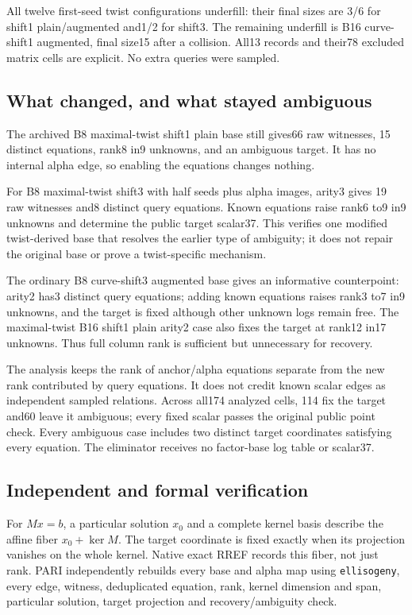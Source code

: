 \documentclass[
  10pt,
]{article}
\begin{document}
All twelve first-seed twist configurations underfill: their final sizes
are 3/6 for shift1 plain/augmented and1/2 for shift3. The remaining
underfill is B16 curve-shift1 augmented, final size15 after a collision.
All13 records and their78 excluded matrix cells are explicit. No extra
queries were sampled.

\subsection{What changed, and what stayed
ambiguous}\label{what-changed-and-what-stayed-ambiguous}

The archived B8 maximal-twist shift1 plain base still gives66 raw
witnesses, 15 distinct equations, rank8 in9 unknowns, and an ambiguous
target. It has no internal alpha edge, so enabling the equations changes
nothing.

For B8 maximal-twist shift3 with half seeds plus alpha images, arity3
gives 19 raw witnesses and8 distinct query equations. Known equations
raise rank6 to9 in9 unknowns and determine the public target scalar37.
This verifies one modified twist-derived base that resolves the earlier
type of ambiguity; it does not repair the original base or prove a
twist-specific mechanism.

The ordinary B8 curve-shift3 augmented base gives an informative
counterpoint: arity2 has3 distinct query equations; adding known
equations raises rank3 to7 in9 unknowns, and the target is fixed
although other unknown logs remain free. The maximal-twist B16 shift1
plain arity2 case also fixes the target at rank12 in17 unknowns. Thus
full column rank is sufficient but unnecessary for recovery.

The analysis keeps the rank of anchor/alpha equations separate from the
new rank contributed by query equations. It does not credit known scalar
edges as independent sampled relations. Across all174 analyzed cells,
114 fix the target and60 leave it ambiguous; every fixed scalar passes
the original public point check. Every ambiguous case includes two
distinct target coordinates satisfying every equation. The eliminator
receives no factor-base log table or scalar37.

\subsection{Independent and formal
verification}\label{independent-and-formal-verification}

For \(Mx=b\), a particular solution \(x_0\) and a complete kernel basis
describe the affine fiber \(x_0+\ker M\). The target coordinate is fixed
exactly when its projection vanishes on the whole kernel. Native exact
RREF records this fiber, not just rank. PARI independently rebuilds
every base and alpha map using \texttt{ellisogeny}, every edge, witness,
deduplicated equation, rank, kernel dimension and span, particular
solution, target projection and recovery/ambiguity check.
\end{document}
